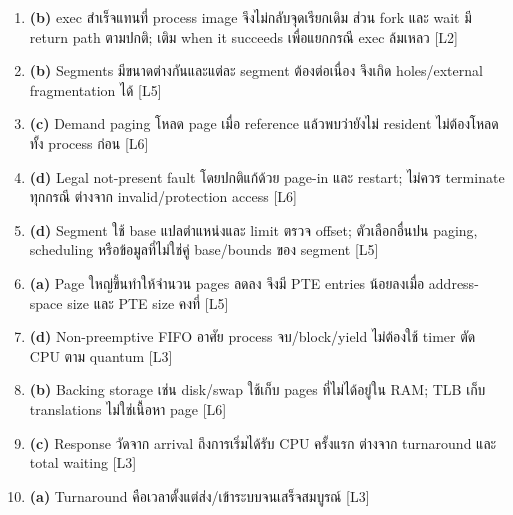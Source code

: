 \begin{enumerate}[leftmargin=1.4em,start=23,itemsep=0.18cm]
\item \textbf{(b)} exec สำเร็จแทนที่ process image จึงไม่กลับจุดเรียกเดิม ส่วน fork และ wait มี return path ตามปกติ; เติม when it succeeds เพื่อแยกกรณี exec ล้มเหลว {\small [L2]}
\item \textbf{(b)} Segments มีขนาดต่างกันและแต่ละ segment ต้องต่อเนื่อง จึงเกิด holes/external fragmentation ได้ {\small [L5]}
\item \textbf{(c)} Demand paging โหลด page เมื่อ reference แล้วพบว่ายังไม่ resident ไม่ต้องโหลดทั้ง process ก่อน {\small [L6]}
\item \textbf{(d)} Legal not-present fault โดยปกติแก้ด้วย page-in และ restart; ไม่ควร terminate ทุกกรณี ต่างจาก invalid/protection access {\small [L6]}
\item \textbf{(d)} Segment ใช้ base แปลตำแหน่งและ limit ตรวจ offset; ตัวเลือกอื่นปน paging, scheduling หรือข้อมูลที่ไม่ใช่คู่ base/bounds ของ segment {\small [L5]}
\item \textbf{(a)} Page ใหญ่ขึ้นทำให้จำนวน pages ลดลง จึงมี PTE entries น้อยลงเมื่อ address-space size และ PTE size คงที่ {\small [L5]}
\item \textbf{(d)} Non-preemptive FIFO อาศัย process จบ/block/yield ไม่ต้องใช้ timer ตัด CPU ตาม quantum {\small [L3]}
\item \textbf{(b)} Backing storage เช่น disk/swap ใช้เก็บ pages ที่ไม่ได้อยู่ใน RAM; TLB เก็บ translations ไม่ใช่เนื้อหา page {\small [L6]}
\item \textbf{(c)} Response วัดจาก arrival ถึงการเริ่มได้รับ CPU ครั้งแรก ต่างจาก turnaround และ total waiting {\small [L3]}
\item \textbf{(a)} Turnaround คือเวลาตั้งแต่ส่ง/เข้าระบบจนเสร็จสมบูรณ์ {\small [L3]}
\end{enumerate}
\newpage{}
